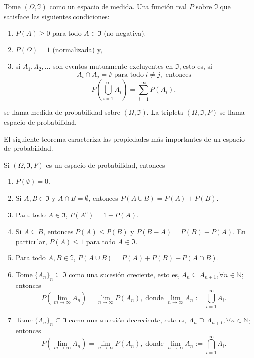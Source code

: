 	\begin{defi}
		Tome $(\Omega,\Im)$ como un espacio de medida. Una función real $P$ sobre $\Im$ que satisface las siguientes condiciones:
		\begin{enumerate}
			\item $P(A)\geq0$ para todo $A\in\Im$ (no negativa),
			\item $P(\Omega)=1$ (normalizada) y,
			\item si $A_1,A_2,\dots$ son eventos mutuamente excluyentes en $\Im$, esto es, si
			$$A_i\cap A_j=\emptyset \text{ para todo }i\neq j, \text{ entonces}$$
			$$P\left(\bigcup_{i=1}^\infty A_i\right)=\sum_{i=1}^\infty P(A_i),$$
		\end{enumerate}
		se llama medida de probabilidad sobre $(\Omega,\Im)$. La tripleta $(\Omega,\Im,P)$ se llama espacio de probabilidad.
	\end{defi}
	El siguiente teorema caracteriza las propiedades más importantes de un espacio de probabilidad.
	\begin{theo}
		Si $(\Omega,\Im,P)$ es un espacio de probabilidad, entonces
		\begin{enumerate}
			\item $P(\emptyset)=0$.
			\item Si $A,B\in\Im$ y $A\cap B=\emptyset$, entonces $P(A\cup B)=P(A)+P(B).$
			\item Para todo $A\in\Im$, $P(A^c)=1-P(A).$
			\item Si $A\subseteq B$, entonces $P(A)\leq P(B)$ y $P(B-A)=P(B)-P(A).$ En particular, $P(A)\leq1$ para todo $A\in\Im$.
			\item Para todo $A,B\in\Im$, $P(A\cup B)=P(A)+P(B)-P(A\cap B)$.
		
		\item Tome $\{A_n\}_n\subseteq\Im$ como una sucesión creciente, esto es, $A_n\subseteq A_{n+1}, \forall n\in\mathbb{N}$; entonces
			$$P\left(\lim_{m\rightarrow\infty}A_n\right)=\lim_{n\rightarrow\infty}P(A_n), \text{ donde } \lim_{n\rightarrow\infty} A_n:=\bigcup_{i=1}^\infty A_i.$$
		\item Tome $\{A_n\}_n\subseteq\Im$ como una sucesión decreciente, esto es, $A_n\supseteq A_{n+1}, \forall n\in\mathbb{N}$; entonces
			$$P\left(\lim_{m\rightarrow\infty}A_n\right)=\lim_{n\rightarrow\infty}P(A_n), \text{ donde } \lim_{n\rightarrow\infty} A_n:=\bigcap_{i=1}^\infty A_i.$$
	\end{enumerate}
	\end{theo}
